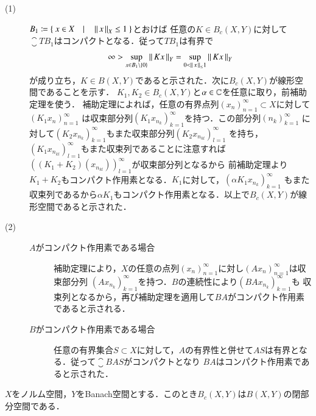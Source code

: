 	\begin{prf}\mbox{}
		\begin{description}
			\item[(1)] $B_1 \coloneqq \left\{\ x \in X \quad |\quad \left\|\, x\, \right\|_{X} \leq 1\ \right\}$とおけば
				任意の$K \in B_c(X,Y)$に対して$\closure{TB_1}$はコンパクトとなる．従って$TB_1$は有界で
				\begin{align}
					\infty > \operatorname*{sup}_{x \in B_1 \backslash \{0\}} \left\|\, Kx\, \right\|_{Y} = \operatorname*{sup}_{0 < \left\|\, x\, \right\|_{\leq} 1} \left\|\, Kx\, \right\|_{Y}
				\end{align}
				が成り立ち，$K \in B(X,Y)$であると示された．次に$B_c(X,Y)$が線形空間であることを示す．
				$K_1, K_2 \in B_c(X,Y)$と$\alpha \in \mathbb{C}$を任意に取り，前補助定理を使う．
				補助定理によれば，任意の有界点列$(x_n)_{n=1}^{\infty} \subset X$に対して$(K_1x_n)_{n=1}^{\infty}$
				は収束部分列$(K_1x_{n_k})_{k=1}^{\infty}$を持つ．この部分列$(n_k)_{k=1}^{\infty}$
				に対して$(K_2x_{n_k})_{k=1}^{\infty}$もまた収束部分列$(K_2x_{n_{kl}})_{l=1}^{\infty}$
				を持ち，$(K_1x_{n_{kl}})_{l=1}^{\infty}$もまた収束列であることに注意すれば
				$\left( (K_1 + K_2)(x_{n_{kl}}) \right)_{l=1}^{\infty}$が収束部分列となるから
				前補助定理より$K_1 + K_2$もコンパクト作用素となる．$K_1$に対して，$(\alpha K_1x_{n_k})_{k=1}^{\infty}$
				もまた収束列であるから$\alpha K_1$もコンパクト作用素となる．以上で$B_c(X,Y)$が線形空間であると示された．
			
			\item[(2)]\mbox{}
				\begin{description}
					\item[$A$がコンパクト作用素である場合]
						補助定理により，$X$の任意の点列$(x_n)_{n=1}^{\infty}$に対し$(Ax_n)_{n=1}^{\infty}$は収束部分列
						$(Ax_{n_k})_{k=1}^{\infty}$を持つ．$B$の連続性により$(BAx_{n_k})_{k=1}^{\infty}$も
						収束列となるから，再び補助定理を適用して$BA$がコンパクト作用素であると示される．
					
					\item[$B$がコンパクト作用素である場合]
						任意の有界集合$S \subset X$に対して，$A$の有界性と併せて$AS$は有界となる．従って$\closure{BAS}$がコンパクトとなり
						$BA$はコンパクト作用素であると示された．
				\end{description}
		\end{description}
		\QED
	\end{prf}
	
	
	\begin{itembox}[l]{}
		\begin{prp}[$B_c(X,Y)$は閉]
			$X$をノルム空間，$Y$をBanach空間とする．このとき$B_c(X,Y)$は$B(X,Y)$の閉部分空間である．
		\end{prp}
	\end{itembox}
	
